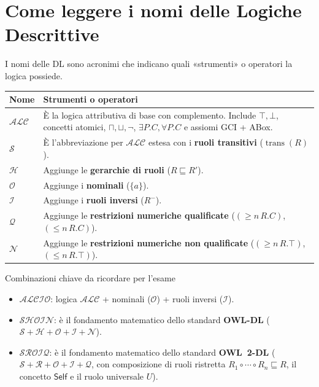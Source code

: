 \section{Come leggere i nomi delle Logiche Descrittive}

I nomi delle DL sono acronimi che indicano quali «strumenti» o operatori
la logica possiede.

\begin{center}
    \begingroup
    \renewcommand{\arraystretch}{1.3}
    \begin{tabularx}{\linewidth}{@{}lX@{}}
        \hline
        \textbf{Nome} & \textbf{Strumenti o operatori} \\
        \hline
        \(\mathcal{ALC}\) & È la logica attributiva di base con complemento.
            Include \(\top,\bot\), concetti atomici, \(\sqcap,\sqcup,\neg\),
            \(\exists P.C,\forall P.C\) e assiomi GCI + ABox. \\
        \(\mathcal S\) & È l'abbreviazione per \(\mathcal{ALC}\) estesa con
            i \textbf{ruoli transitivi} (\(\operatorname{trans}(R)\)). \\
        \(\mathcal H\) & Aggiunge le \textbf{gerarchie di ruoli} (\(R\sqsubseteq R'\)). \\
        \(\mathcal O\) & Aggiunge i \textbf{nominali} (\(\{a\}\)). \\
        \(\mathcal I\) & Aggiunge i \textbf{ruoli inversi} (\(R^{-}\)). \\
        \(\mathcal Q\) & Aggiunge le \textbf{restrizioni numeriche qualificate}
            (\((\geq n\,R.C)\), \((\leq n\,R.C)\)). \\
        \(\mathcal N\) & Aggiunge le \textbf{restrizioni numeriche non qualificate}
            (\((\geq n\,R.\top)\), \((\leq n\,R.\top)\)). \\
        \hline
    \end{tabularx}
    \endgroup
\end{center}

\begin{observation}{Combinazioni chiave da ricordare per l'esame}
    \begin{itemize}
        \item \(\mathcal{ALCIO}\): logica \(\mathcal{ALC}\) + nominali
            (\(\mathcal O\)) + ruoli inversi (\(\mathcal I\)).
        \item \(\mathcal{SHOIN}\): è il fondamento matematico dello standard
            \textbf{OWL-DL} (\(\mathcal S+\mathcal H+\mathcal O+\mathcal I+\mathcal N\)).
        \item \(\mathcal{SROIQ}\): è il fondamento matematico dello standard
            \textbf{OWL~2-DL} (\(\mathcal S+\mathcal R+\mathcal O+\mathcal I+\mathcal Q\),
            con composizione di ruoli ristretta \(R_1\circ\cdots\circ R_n\sqsubseteq R\),
            il concetto \(\mathsf{Self}\) e il ruolo universale \(U\)).
    \end{itemize}
\end{observation}

